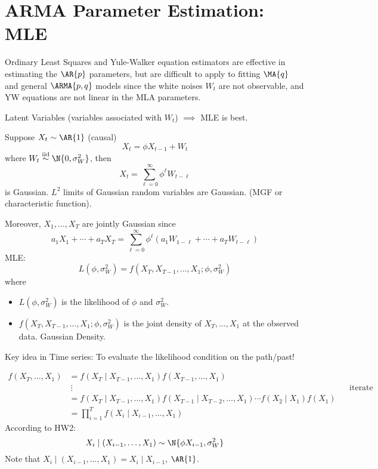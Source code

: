 \section{ARMA Parameter Estimation: MLE}
Ordinary Least Squares and Yule-Walker equation
estimators are effective in estimating the $ \AR{p} $
parameters, but are difficult to apply to fitting
$ \MA{q} $ and general $ \ARMA{p,q} $
models since the white noises $ W_t $ are not observable,
and YW equations are not linear in the MLA parameters.

Latent Variables (variables associated with $ W_t $) $\implies$
MLE is best.

Suppose $ X_t \sim \AR{1} $ (causal)
\[ X_t=\phi X_{t-1}+W_t \]
where $ W_t \stackrel{\text{iid}}{\sim}\N{0,\sigma_W^2} $,
then
\[ X_t=\sum_{\ell=0}^{\infty} \phi^\ell W_{t-\ell} \]
is Gaussian. $ L^2 $ limits of Gaussian random variables are Gaussian.
(MGF or characteristic function).

Moreover, $ X_1,\ldots,X_T $ are jointly Gaussian since
\[ a_1X_1+\cdots+a_T X_T= \sum_{\ell=0}^{\infty}
    \phi^\ell (a_1 W_{1-\ell}+\cdots+a_T W_{t-\ell}) \]
MLE\@:
\[ L(\phi,\sigma_W^2)=f(X_T, X_{T-1},\ldots,X_1;\phi,\sigma_W^2) \]
where
\begin{itemize}
    \item $L(\phi,\sigma_W^2)$ is the likelihood of $ \phi $ and $ \sigma_W^2 $.
    \item $f(X_T, X_{T-1},\ldots,X_1;\phi,\sigma_W^2)$ is the joint density
          of $ X_T,\ldots,X_1 $ at the observed data. Gaussian Density.
\end{itemize}
Key idea in Time series: To evaluate the likelihood condition on
the path/past!

\begin{align*}
    f(X_T,\ldots,X_1)
     & =f(X_T\mid X_{T-1},\ldots,X_1)f(X_{T-1},\ldots,X_1)                                                            \\
     & \:\vdots                                                                                   &  & \text{iterate} \\
     & =f(X_T\mid X_{T-1},\ldots,X_1)f(X_{T-1}\mid X_{T-2},\ldots,X_1)\cdots f(X_2\mid X_1)f(X_1)                     \\
     & =\prod_{i=1}^T f(X_i\mid X_{i-1},\ldots,X_1)
\end{align*}
According to HW2:
\[ X_i \mid (X_{i-1},\ldots,X_1)\sim \N{\phi X_{i-1},\sigma_W^2} \]
Note that $  X_i \mid (X_{i-1},\ldots,X_1)=X_i\mid X_{i-1} $, $ \AR{1} $.

